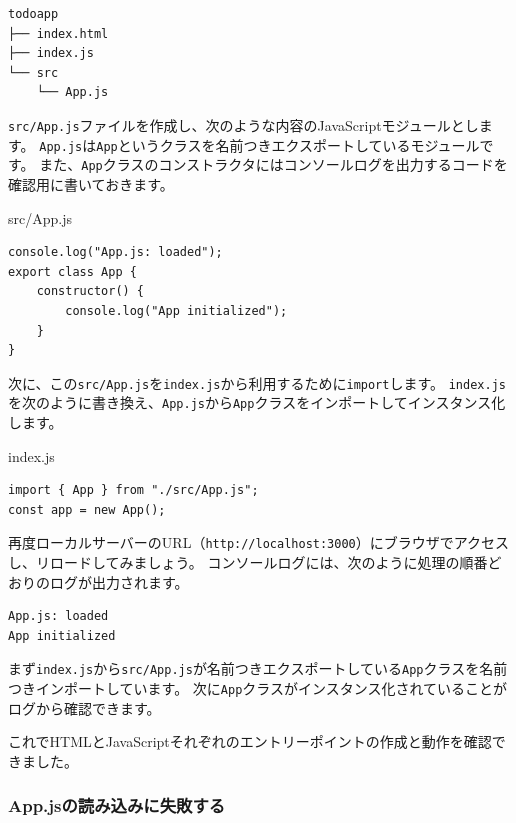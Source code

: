 \begin{lstlisting}
todoapp
├── index.html
├── index.js
└── src
    └── App.js
\end{lstlisting}

\texttt{src/App.js}ファイルを作成し、次のような内容のJavaScriptモジュールとします。
\texttt{App.js}は\texttt{App}というクラスを名前つきエクスポートしているモジュールです。
また、\texttt{App}クラスのコンストラクタにはコンソールログを出力するコードを確認用に書いておきます。

\begin{listtitle}
src/App.js
\end{listtitle}
\begin{lstlisting}
console.log("App.js: loaded");
export class App {
    constructor() {
        console.log("App initialized");
    }
}
\end{lstlisting}
\listend

次に、この\texttt{src/App.js}を\texttt{index.js}から利用するために\texttt{import}します。
\texttt{index.js}を次のように書き換え、\texttt{App.js}から\texttt{App}クラスをインポートしてインスタンス化します。

\begin{listtitle}
index.js
\end{listtitle}
\begin{lstlisting}
import { App } from "./src/App.js";
const app = new App();
\end{lstlisting}
\listend

再度ローカルサーバーのURL（\texttt{http://localhost:3000}）にブラウザでアクセスし、リロードしてみましょう。
コンソールログには、次のように処理の順番どおりのログが出力されます。

\begin{lstlisting}
App.js: loaded
App initialized
\end{lstlisting}

まず\texttt{index.js}から\texttt{src/App.js}が名前つきエクスポートしている\texttt{App}クラスを名前つきインポートしています。
次に\texttt{App}クラスがインスタンス化されていることがログから確認できます。

これでHTMLとJavaScriptそれぞれのエントリーポイントの作成と動作を確認できました。

\hypertarget{error-import-app-js}{%
\subsubsection{App.jsの読み込みに失敗する}\label{error-import-app-js}}

